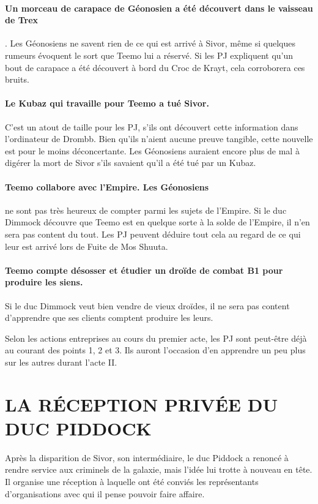 \documentclass[a4paper,10pt,twoside,twocolumn,openany]{book}
\begin{document}
\paragraph{Un morceau de carapace de Géonosien a été découvert dans le vaisseau de Trex}. Les Géonosiens
ne savent rien de ce qui est arrivé à Sivor, même si
quelques rumeurs évoquent le sort que Teemo lui a
réservé. Si les PJ expliquent qu’un bout de carapace
a été découvert à bord du Croc de Krayt, cela corroborera ces bruits.

\paragraph{Le Kubaz qui travaille pour Teemo a tué Sivor.}
C’est un atout de taille pour les PJ, s’ils ont découvert
cette information dans l’ordinateur de Drombb. Bien
qu’ils n’aient aucune preuve tangible, cette nouvelle
est pour le moins déconcertante. Les Géonosiens auraient encore plus de mal à digérer la mort de Sivor
s’ils savaient qu’il a été tué par un Kubaz.

\paragraph{Teemo collabore avec l’Empire. Les Géonosiens}
ne sont pas très heureux de compter parmi les sujets de l’Empire. Si le duc Dimmock découvre que
Teemo est en quelque sorte à la solde de l’Empire, il n’en
sera
pas
content du
tout. Les PJ
peuvent déduire
tout cela au regard
de ce qui leur est arrivé lors
de Fuite de Mos Shuuta.

\paragraph{Teemo compte désosser et étudier
un droïde de combat B1 pour produire
les siens.} Si le duc Dimmock veut bien
vendre de vieux droïdes, il ne sera pas content
d’apprendre que ses clients comptent produire
les leurs.

Selon les actions entreprises au cours du premier acte, les PJ sont peut-être déjà au courant
des points 1, 2 et 3. Ils auront l’occasion d’en apprendre un peu plus sur les autres durant l’acte II.

\section{LA RÉCEPTION PRIVÉE
DU DUC PIDDOCK}
Après la disparition de Sivor, son intermédiaire, le
duc Piddock a renoncé à rendre service aux criminels
de la galaxie, mais l’idée lui trotte à nouveau en tête.
Il organise une réception à laquelle ont été conviés les
représentants d’organisations avec qui il pense pouvoir
faire affaire.
\end{document}
